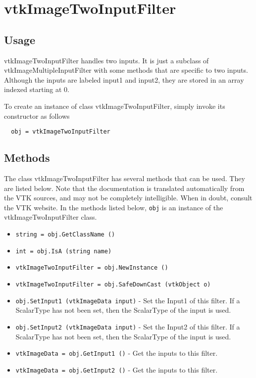 \section{vtkImageTwoInputFilter}

\subsection{Usage}

 vtkImageTwoInputFilter handles two inputs.  
 It is just a subclass of vtkImageMultipleInputFilter with some
 methods that are specific to two inputs.  Although the inputs are labeled
 input1 and input2, they are stored in an array indexed starting at 0.

To create an instance of class vtkImageTwoInputFilter, simply
invoke its constructor as follows
\begin{verbatim}
  obj = vtkImageTwoInputFilter
\end{verbatim}
\subsection{Methods}

The class vtkImageTwoInputFilter has several methods that can be used.
  They are listed below.
Note that the documentation is translated automatically from the VTK sources,
and may not be completely intelligible.  When in doubt, consult the VTK website.
In the methods listed below, \verb|obj| is an instance of the vtkImageTwoInputFilter class.
\begin{itemize}
\item  \verb|string = obj.GetClassName ()|

\item  \verb|int = obj.IsA (string name)|

\item  \verb|vtkImageTwoInputFilter = obj.NewInstance ()|

\item  \verb|vtkImageTwoInputFilter = obj.SafeDownCast (vtkObject o)|

\item  \verb|obj.SetInput1 (vtkImageData input)| -  Set the Input1 of this filter. If a ScalarType has not been set,
 then the ScalarType of the input is used.

\item  \verb|obj.SetInput2 (vtkImageData input)| -  Set the Input2 of this filter. If a ScalarType has not been set,
 then the ScalarType of the input is used.

\item  \verb|vtkImageData = obj.GetInput1 ()| -  Get the inputs to this filter.

\item  \verb|vtkImageData = obj.GetInput2 ()| -  Get the inputs to this filter.

\end{itemize}
